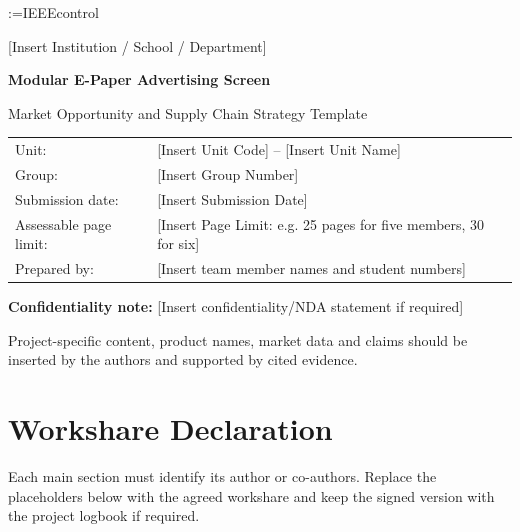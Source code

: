 \documentclass[11pt,a4paper]{article}
\makeatletter
\providecommand{\bstctlcite}[1]{%
  \@bsphack
  \@for\@citeb:=#1\do{%
    \edef\@citeb{\expandafter\@firstofone\@citeb}%
    \if@filesw\immediate\write\@auxout{\string\citation{\@citeb}}\fi
  }%
  \@esphack}
\makeatother
\begin{document}
\bstctlcite{IEEEcontrol}

\begin{titlepage}
    \centering
    \vspace*{1cm}
    {\large [Insert Institution / School / Department]\par}
    \vspace{1.5cm}
    {\Huge\bfseries Modular E-Paper Advertising Screen\par}
    \vspace{0.4cm}
    {\Large Market Opportunity and Supply Chain Strategy Template\par}
    \vspace{1.5cm}
    \begin{tabular}{@{}ll@{}}
        Unit: & [Insert Unit Code] -- [Insert Unit Name] \\
        Group: & [Insert Group Number] \\
        Submission date: & [Insert Submission Date] \\
        Assessable page limit: & [Insert Page Limit: e.g. 25 pages for five members, 30 for six] \\
        Prepared by: & [Insert team member names and student numbers] \\
    \end{tabular}
    \vfill
    \textbf{Confidentiality note:} [Insert confidentiality/NDA statement if required]

    \vspace{0.7cm}
    Project-specific content, product names, market data and claims should be inserted by the authors and supported by cited evidence.
\end{titlepage}


\section*{Workshare Declaration}
Each main section must identify its author or co-authors. Replace the placeholders below with the agreed workshare and keep the signed version with the project logbook if required.
\end{document}
